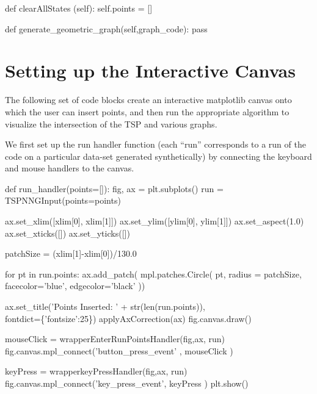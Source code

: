       def clearAllStates (self):
          self.points = []

      def generate_geometric_graph(self,graph_code):
           pass
\nwendcode{}\nwdocspar

\section{Setting up the Interactive Canvas}
The following set of code blocks create an interactive matplotlib canvas onto which the user can insert points, and then 
run the appropriate algorithm to visualize the intersection of the TSP and various graphs. 

We first set up the run handler function (each ``run'' corresponds to a run of the code on a particular data-set generated synthetically)
by connecting the keyboard and mouse handlers to the canvas. 

\nwenddocs{}\endmoddef\nwstartdeflinemarkup{}\nwenddeflinemarkup
def run_handler(points=[]):
    fig, ax =  plt.subplots()
    run = TSPNNGInput(points=points)
    
    ax.set_xlim([xlim[0], xlim[1]])
    ax.set_ylim([ylim[0], ylim[1]])
    ax.set_aspect(1.0)
    ax.set_xticks([])
    ax.set_yticks([])
 
    patchSize  = (xlim[1]-xlim[0])/130.0

    for pt in run.points:
       ax.add_patch( mpl.patches.Circle( pt, radius = patchSize,
                           facecolor='blue', edgecolor='black'  ))

    ax.set_title('Points Inserted: ' + str(len(run.points)), \\
                   fontdict=\{'fontsize':25\})
    applyAxCorrection(ax)
    fig.canvas.draw()

    mouseClick   = wrapperEnterRunPointsHandler(fig,ax, run)
    fig.canvas.mpl_connect('button_press_event' , mouseClick )
      
    keyPress     = wrapperkeyPressHandler(fig,ax, run)
    fig.canvas.mpl_connect('key_press_event', keyPress   )
    plt.show()
\nwendcode{}\nwdocspar



